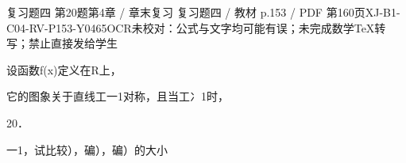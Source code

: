 \begin{bankitem}{复习题四 第20题}{第4章 / 章末复习 复习题四 / 教材 p.153 / PDF 第160页}{XJ-B1-C04-RV-P153-Y0465}{OCR未校对：公式与文字均可能有误；未完成数学TeX转写；禁止直接发给学生}
\begin{ocrdraft}
\par
设函数f(x)定义在R上，
\par
它的图象关于直线工一1对称，且当工冫1时，
\par
20．
\par
一1，试比较），碥），碥）的大小
\end{ocrdraft}
\end{bankitem}
